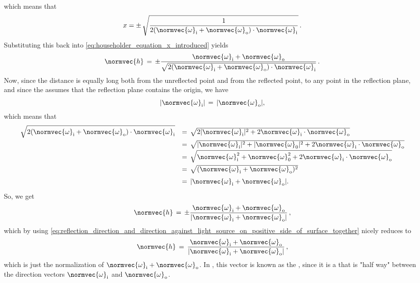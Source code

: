 %
which means that
%
\begin{equation}
x = \pm\,\sqrt{\frac{1}{2(\normvec{\omega}_{\text{i}} + \normvec{\omega}_{\text{o}})\cdot\normvec{\omega}_{\text{i}}}}\,.
\end{equation}
%
Substituting this back into \eqref{eq:householder_equation_x_introduced} yields
%
\begin{equation} \label{eq:householder_equation_x_replaced}
\normvec{h} \,=\, \pm\frac{\normvec{\omega}_{\text{i}} + \normvec{\omega}_{\text{o}}}{\sqrt{2(\normvec{\omega}_{\text{i}} + \normvec{\omega}_{\text{o}})\cdot\normvec{\omega}_{\text{i}}}}\,.
\end{equation}
%
Now, since the distance is equally long both from the unreflected point and from the reflected point, to any point in the reflection plane, and since the  assumes that the reflection plane contains the origin, we have
%
\begin{equation}
|\normvec{\omega}_{\text{i}}| \,=\, |\normvec{\omega}_{\text{o}}|,
\end{equation}
%
which means that
%
\begin{equation}
\renewcommand*{\arraystretch}{1.5}
\begin{array}{rl}
\displaystyle \sqrt{2(\normvec{\omega}_{\text{i}} + \normvec{\omega}_{\text{o}})\cdot\normvec{\omega}_{\text{i}}} & =\, \sqrt{2|\normvec{\omega}_{\text{i}}|^2 + 2\normvec{\omega}_{\text{i}}\cdot \normvec{\omega}_{\text{o}}} \\
\displaystyle & =\, \sqrt{|\normvec{\omega}_{\text{i}}|^2 + |\normvec{\omega}_{\text{0}}|^2 + 2\normvec{\omega}_{\text{i}}\cdot \normvec{\omega}_{\text{o}}} \\
\displaystyle & =\, \sqrt{\normvec{\omega}_{\text{i}}^2 + \normvec{\omega}_{\text{0}}^2 + 2\normvec{\omega}_{\text{i}}\cdot \normvec{\omega}_{\text{o}}} \\
\displaystyle & =\, \sqrt{(\normvec{\omega}_{\text{i}}+\normvec{\omega}_{\text{o}})^2} \\
\displaystyle & =\, |\normvec{\omega}_{\text{i}}+\normvec{\omega}_{\text{o}}|.
\end{array}
\end{equation}
%
So, we get
%
\begin{equation} \label{eq:halfway_vector_two_alternatives}
\normvec{h} \,=\, \pm\frac{\normvec{\omega}_{\text{i}} + \normvec{\omega}_{\text{o}}}{|\normvec{\omega}_{\text{i}}+\normvec{\omega}_{\text{o}}|}\,,
\end{equation}
%
which by using \eqref{eq:reflection_direction_and_direction_against_light_source_on_positive_side_of_surface_together} nicely reduces to
%
\begin{equation} \label{eq:halfway_vector_final}
\normvec{h} \,=\, \frac{\normvec{\omega}_{\text{i}} + \normvec{\omega}_{\text{o}}}{|\normvec{\omega}_{\text{i}}+\normvec{\omega}_{\text{o}}|}\,,
\end{equation}
%
which is just the normalization of $\normvec{\omega}_{\text{i}}+\normvec{\omega}_{\text{o}}$. In , this vector is known as the , since it is a  that is "half way" between the direction vectors $\normvec{\omega}_{\text{i}}$ and $\normvec{\omega}_{\text{o}}$.

